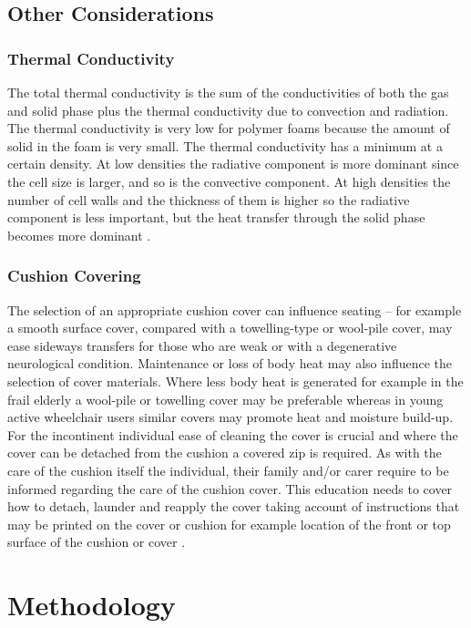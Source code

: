 \documentclass[conference]{IEEEtran}
\begin{document}
    \subsection{Other Considerations}
        \subsubsection{Thermal Conductivity}
        The total thermal conductivity is the sum of the conductivities of both the gas and solid phase plus the thermal conductivity due to convection and radiation. The thermal conductivity is very low for polymer foams because the amount of solid in the foam is very small. The thermal conductivity has a minimum at a certain density. At low densities the radiative component is more dominant since the cell size is larger, and so is the convective component. At high densities the number of cell walls and the thickness of them is higher so the radiative component is less important, but the heat transfer through the solid phase becomes more dominant \cite{sivertsen2007polymer}.
        
        \subsubsection{Cushion Covering}
        The selection of an appropriate cushion cover can influence seating – for example a smooth surface cover, compared with a towelling-type or wool-pile cover, may ease sideways transfers for those who are weak or with a degenerative neurological condition. Maintenance or loss of body heat may also influence the selection of cover materials. Where less body heat is generated for example in the frail elderly a wool-pile or towelling cover may be preferable whereas in young active wheelchair users similar covers may promote heat and moisture build-up. For the incontinent individual ease of cleaning the cover is crucial and where the cover can be detached from the cushion a covered zip is required. As with the care of the cushion itself the individual, their family and/or carer require to be informed regarding the care of the cushion cover. This education needs to cover how to detach, launder and reapply the cover taking account of instructions that may be printed on the cover or cushion for example location of the front or top surface of the cushion or cover \cite{TissueViabilitySociety2013}.


\section{Methodology}
\end{document}

